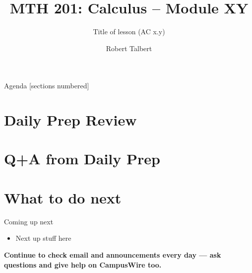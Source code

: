 \documentclass[10pt]{beamer}
\title{MTH 201: Calculus -- Module XY}
\subtitle{Title of lesson (AC x.y)}
\date{}
\author{Robert Talbert}
\institute{Grand Valley State University}
\begin{document}
\maketitle

\begin{frame}{Agenda}
  [sections numbered]
  \tableofcontents%
\end{frame}





\section[Review of Daily Prep]{Daily Prep Review}


\section[Q+A]{Q+A from Daily Prep}


\section[What to do next]{What to do next}
\begin{frame}{Coming up next}
    \begin{itemize}
    \item Next up stuff here 
\end{itemize}

\textbf{Continue to check email and announcements every day --- ask questions and give help on CampusWire too.}

\vfill
\begin{center}\ccbysa\end{center}

\end{frame}
\end{document}
